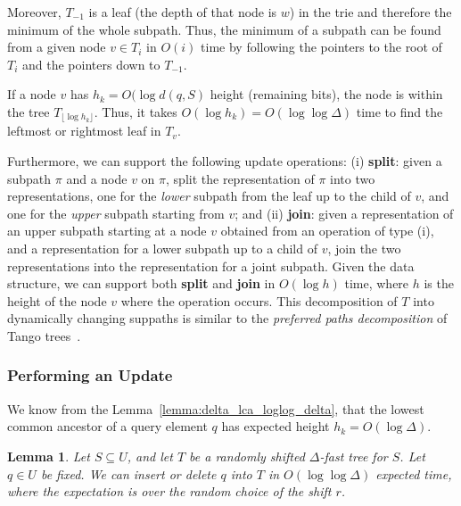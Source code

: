 \documentclass[a4paper,11pt]{article}
\newtheorem{lemma}[theorem]{Lemma}
\newcommand{\?}{\mskip1.5mu}
\begin{document}
Moreover, $T_{-1}$ is a leaf (the depth of that node is $w$) 
in the trie and therefore the minimum of the whole subpath. Thus, 
the minimum of a subpath can be found from a given node 
$v \in T_i$ in $O(i)$ time by following the
pointers to the root of $T_i$ and the pointers down to $T_{-1}$.

If a node $v$ has $h_k = O(\log d(q, S)$ height (remaining bits), 
the node is within
the tree $T_{\lfloor \log h_k \rfloor}$. Thus, it takes 
$O(\log h_k) = O(\log\log\Delta)$ time to find the leftmost
or rightmost leaf in $T_v$.

Furthermore, we can support the following update operations:
(i) \textbf{split}: given a subpath $\pi$ and a node $v$ on $\pi$, split 
the representation of $\pi$ into two representations, one for the 
\emph{lower} subpath from the leaf up to the child of $v$, and
one for the \emph{upper} subpath starting from $v$; and (ii) 
\textbf{join}: given a
representation of an upper subpath starting at a node $v$ obtained 
from an operation of type (i), and a representation for 
a lower subpath up to a child of $v$, join the two representations
into the representation for a joint subpath.
Given the data structure, we can support
both \textbf{split} and \textbf{join} in
 $O(\log h)$ time, where $h$ is the height of 
the node $v$ where the operation occurs. 
This decomposition of $T$ into dynamically changing suppaths
is similar to the \emph{preferred paths decomposition} of
Tango trees~\cite{DemaineHaIaPa07}.

\subsubsection{Performing an Update}

We know from the Lemma~\ref{lemma:delta_lca_loglog_delta}, that 
the lowest common ancestor of a query element $q$ has expected 
height $h_k = O(\log \Delta)$.

\begin{lemma}
\label{lemma:delta_insert}
Let $S \subseteq U$, and let $T$ be
a randomly shifted $\Delta$-fast tree for 
$S$.  Let $q \in U$ be fixed.
We can insert or delete $q$ into $T$
in $O(\log \log \Delta)$ expected time, where the expectation is 
over the random choice of the shift $r$.
\end{lemma}
\end{document}
